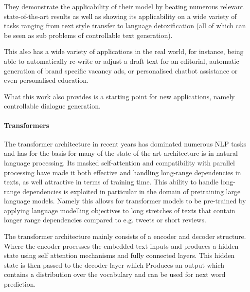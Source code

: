 They demonstrate the applicability of their model by beating numerous relevant state-of-the-art results as well as showing its applicability on a wide variety of tasks ranging from text style transfer to language detoxification (all of which can be seen as sub problems of controllable text generation). 

This also has a wide variety of applications in the real world, for instance, being able to automatically re-write or adjust a draft text for an editorial, automatic generation of brand specific vacancy ads, or personalised chatbot assistance or even personalised education.

What this work also provides is a starting point for new applications, namely controllable dialogue generation.


\paragraph{Transformers}

The transformer architecture in recent years has dominated numerous NLP tasks and has for the basis for many of the state of the art architecture is in natural language processing. Its masked self-attention and compatibility with parallel processing have made it both effective and handling long-range dependencies in texts, as well attractive in terms of training time. This ability to handle long-range dependencies is exploited in particular in the domain of pretraining large language models. Namely this allows for transformer models to be pre-trained by applying language modelling objectives to long stretches of texts that contain longer range dependencies compared to e.g. tweets or short reviews. 

The transformer architecture mainly consists of a encoder and decoder structure. Where the encoder processes the embedded text inputs and produces a hidden state using self attention mechanisms and fully connected layers. This hidden state is then passed to the decoder layer which Produces an output which contains a distribution over the vocabulary and can be used for next word prediction.



